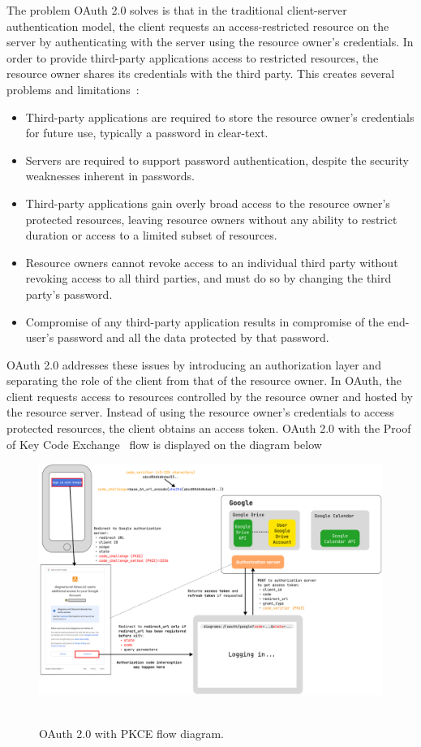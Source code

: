 The problem OAuth 2.0 solves is that in the traditional client-server authentication model,
the client requests an access-restricted resource
on the server by authenticating with the server using the resource owner's credentials.
In order to provide third-party applications access to restricted resources,
the resource owner shares its credentials with the third party.
This creates several problems and limitations~\cite{hardt2012oauth}:
\begin{itemize}
    \item Third-party applications are required to store the resource owner's credentials for future use, typically
    a password in clear-text.
    \item Servers are required to support password authentication, despite the security weaknesses inherent in passwords.
    \item Third-party applications gain overly broad access to the resource owner's protected resources,
    leaving resource owners without any ability to restrict duration or access to a limited subset of resources.
    \item Resource owners cannot revoke access to an individual third party without revoking access to all third parties,
    and must do so by changing the third party's password.
    \item Compromise of any third-party application results in compromise of the end-user's password
    and all the data protected by that password.
\end{itemize}
OAuth 2.0 addresses these issues by introducing an authorization layer and separating the role of the client
from that of the resource owner.
In OAuth, the client requests access to resources controlled by the resource owner and hosted by the resource server.
Instead of using the resource owner's credentials to access protected resources, the client obtains an access token.
OAuth 2.0 with the Proof of Key Code Exchange~\cite{bradley2015rfc} flow is displayed on the diagram below
\begin{figure}[H]
    \centering
    \includegraphics[width=1\textwidth]{img/OAuthPkceScheme_1570_1055}
    ~\caption{OAuth 2.0 with PKCE flow diagram.}
\end{figure}

